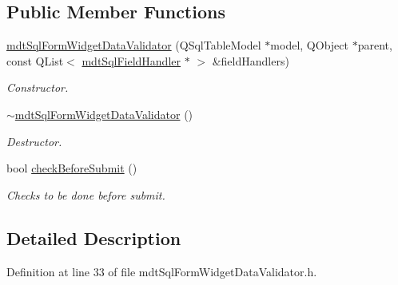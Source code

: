 \subsection*{Public Member Functions}
\begin{DoxyCompactItemize}
\item 
\hyperlink{classmdt_sql_form_widget_data_validator_a3477841cdb2ab659c96ce3363efbadbc}{mdtSqlFormWidgetDataValidator} (QSqlTableModel $\ast$model, QObject $\ast$parent, const QList$<$ \hyperlink{classmdt_sql_field_handler}{mdtSqlFieldHandler} $\ast$ $>$ \&fieldHandlers)
\begin{DoxyCompactList}\small\item\em Constructor. \end{DoxyCompactList}\item 
\hypertarget{classmdt_sql_form_widget_data_validator_aec2505ec4b25b1fae3e37cd13f4afe07}{
\hyperlink{classmdt_sql_form_widget_data_validator_aec2505ec4b25b1fae3e37cd13f4afe07}{$\sim$mdtSqlFormWidgetDataValidator} ()}
\label{classmdt_sql_form_widget_data_validator_aec2505ec4b25b1fae3e37cd13f4afe07}

\begin{DoxyCompactList}\small\item\em Destructor. \end{DoxyCompactList}\item 
bool \hyperlink{classmdt_sql_form_widget_data_validator_aa577e4acf4d0f371c45a67c18c59a924}{checkBeforeSubmit} ()
\begin{DoxyCompactList}\small\item\em Checks to be done before submit. \end{DoxyCompactList}\end{DoxyCompactItemize}


\subsection{Detailed Description}


Definition at line 33 of file mdtSqlFormWidgetDataValidator.h.



